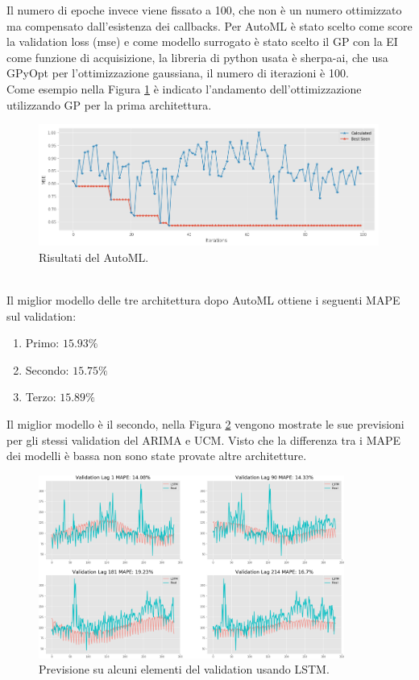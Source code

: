\documentclass[12pt, onecolumn]{article}
\begin{document}
Il numero di epoche invece viene fissato a 100, che non è un numero ottimizzato ma compensato dall'esistenza dei callbacks.
Per AutoML è stato scelto come score la validation loss (mse) e come modello surrogato è stato scelto il GP con la EI come funzione di acquisizione, la libreria di python usata è sherpa-ai, che usa GPyOpt per l'ottimizzazione gaussiana, il numero di iterazioni è 100.\\
Come esempio nella Figura \ref{fig:automl} è indicato l'andamento dell'ottimizzazione utilizzando GP per la prima architettura.
\begin{figure}[!h]
  \centering
  \includegraphics[width=\linewidth,height=4cm]{imgs/automl_1.png}
  \caption{Risultati del AutoML.}
  \label{fig:automl}
\end{figure}\\
Il miglior modello delle tre architettura dopo AutoML ottiene i seguenti MAPE sul validation:
\begin{enumerate}[noitemsep, topsep=0ex]
\item Primo: $15.93\%$
\item Secondo: $15.75\%$
\item Terzo: $15.89\%$
\end{enumerate}
Il miglior modello è il secondo, nella Figura \ref{fig:LSTM_pred} vengono mostrate le sue previsioni per gli stessi validation del ARIMA e UCM. Visto che la differenza tra i MAPE dei modelli è bassa non sono state provate altre architetture.
\begin{figure}[!h]
  \centering
  \includegraphics[width=\linewidth,height=6cm]{imgs/forecast_lstm.png}
  \caption{Previsione su alcuni elementi del validation usando LSTM.}
  \label{fig:LSTM_pred}
\end{figure}\\
\end{document}
